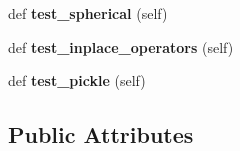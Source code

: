 \begin{DoxyCompactItemize}
def {\bfseries test\+\_\+spherical} (self)
\item 
\mbox{\label{classpygame_1_1tests_1_1math__test_1_1_vector3_type_test_a06b8b63b40054fc52f6d86859bf63e0d}} 
def {\bfseries test\+\_\+inplace\+\_\+operators} (self)
\item 
\mbox{\label{classpygame_1_1tests_1_1math__test_1_1_vector3_type_test_a193c8642e6053fc4fdd2c6a3c9650427}} 
def {\bfseries test\+\_\+pickle} (self)
\end{DoxyCompactItemize}
\subsection*{Public Attributes}

